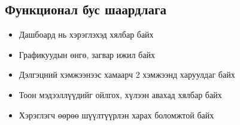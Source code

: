   \subsection{Функционал бус шаардлага}
    \begin{itemize}
        \item Дашбоард нь хэрэглэхэд хялбар байх
        \item Графикуудын өнгө, загвар ижил байх
        \item Дэлгэцний хэмжээнээс хамаарч 2 хэмжээнд харуулдаг байх
        \item Тоон мэдээллүүдийг ойлгох, хүлээн авахад хялбар байх
        \item Хэрэглэгч өөрөө шүүлтүүрлэн харах боломжтой байх
    \end{itemize}
\pagebreak
